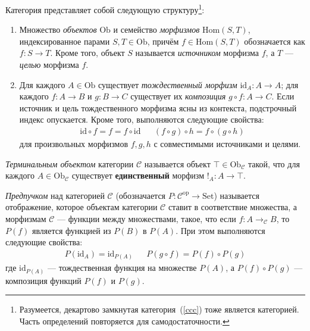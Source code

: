 \begin{definition}[Категория]
    Категория представляет собой следующую
    структуру\footnote{Разумеется, декартово замкнутая
    категория~(\ref{ccc}) тоже является категорией.
    Часть определений повторяется для
    самодостаточности.}:
    \begin{enumerate}
        \item Множество \emph{объектов} $\mathrm{Ob}$ и
            семейство \emph{морфизмов}
            $\mathrm{Hom}(S, T)$, индексированное
            парами $S,T\in\mathrm{Ob}$, причём
            $f\in\mathrm{Hom}(S,T)$ обозначается как
            $f:S\to T$. Кроме того, объект $S$
            называется \emph{источником} морфизма $f$,
            а $T$ --- \emph{целью} морфизма $f$.
        \item Для каждого $A\in\mathrm{Ob}$ существует
            \emph{тождественный морфизм}
            $\mathrm{id}_A: A\to A$; для каждого
            $f:A\to B$ и $g:B\to C$ существует их
            \emph{композиция} $g\circ f:A\to C$.
            Если источник и цель тождественного
            морфизма ясны из контекста, подстрочный
            индекс опускается. Кроме того, выполняются
            следующие свойства:
            \begin{align*}
                \mathrm{id}\circ f = f =
                    f\circ\mathrm{id} & &
                (f \circ g) \circ h =
                    f \circ (g \circ h)
            \end{align*}
            для произвольных морфизмов $f,g,h$
            с совместимыми источниками и целями.
    \end{enumerate}
\end{definition}

\begin{definition}
    \emph{Терминальным объектом} категории
    $\mathcal{C}$ называется объект
    $\top\in\mathrm{Ob}_\mathcal{C}$ такой, что для
    каждого $A\in\mathrm{Ob}_\mathcal{C}$ существует
    \textbf{единственный} морфизм $!_A:A\to\top$.
\end{definition}

\begin{definition}[Предпучок]
    \emph{Предпучком} над категорией $\mathcal{C}$
    (обозначается
    $P:\mathcal{C}^\mathrm{op}\to\mathrm{Set}$)
    называется отображение, которое объектам категории
    $\mathcal{C}$ ставит в соответствие множества, а
    морфизмам $\mathcal{C}$ --- функции между
    множествами, такое, что если
    $f:A\to_\mathcal{C} B$, то $P(f)$ является функцией
    из $P(B)$ в $P(A)$. При этом выполняются следующие
    свойства:
    \begin{align*}
        P(\mathrm{id}_A)=\mathrm{id}_{P(A)} & &
        P(g\circ f)=P(f)\circ P(g)
    \end{align*}
    где $\mathrm{id}_{P(A)}$ --- тождественная функция
    на множестве $P(A)$, а $P(f)\circ P(g)$ ---
    композиция функций $P(f)$ и $P(g)$.
\end{definition}

